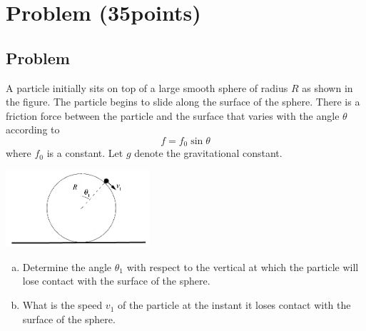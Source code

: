 \documentclass[solutions]{esg8012exam}
\begin{document}
\section{Problem \thesection\space(35\space points)}
\subsection{Problem}
  A particle initially sits on top of a large smooth sphere of radius $R$ as shown in the figure. The particle begins to slide along the surface of the sphere. There is a friction force between the particle and the surface that varies with the angle $\theta$ according to
  $$f = f_0\sin\theta$$
  where $f_0$ is a constant. Let $g$ denote the gravitational constant.
  \begin{center}\includegraphics[width=0.4\textwidth]{exam2_p2_1}\end{center}
  \begin{enumerate}[(a)]
    \item Determine the angle $\theta_1$ with respect to the vertical at which the particle will lose contact with the surface of the sphere.
    \item What is the speed $v_1$ of the particle at the instant it loses contact with the surface of the sphere.
  \end{enumerate}
\end{document}
